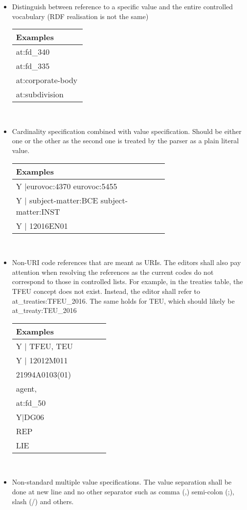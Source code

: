 \begin{itemize}
    \item
    Distinguish between reference to a specific value and the entire controlled vocabulary (RDF realisation is not the same)

    \begin{tabular}{|p{0.3\linewidth}|}
        \hline
        \textbf{Examples} \\ \hline
        at:fd\_340      \\ \hline
        at:fd\_335      \\ \hline
        at:corporate-body       \\ \hline
        at:subdivision      \\ \hline
    \end{tabular}
    \\
    \item
    Cardinality specification combined with value specification. Should be either one or the other as the second one is treated by the parser as a plain literal value.

    \begin{tabular}{|p{0.65\linewidth}|}
        \hline
        \textbf{Examples} \\ \hline
        Y |eurovoc:4370 eurovoc:5455      \\ \hline
        Y | subject-matter:BCE subject-matter:INST      \\ \hline
        Y | 12016EN01       \\ \hline
    \end{tabular}
    \\
    \item
    Non-URI code references that are meant as URIs. The editors shall also pay attention when resolving the references as the current codes do not correspond to those in controlled lists. For example, in the treaties table, the TFEU concept does not exist. Instead, the editor shall refer to at\_treaties:TFEU\_2016. The same holds for TEU, which should likely be at\_treaty:TEU\_2016

    \begin{tabular}{|p{0.4\linewidth}|}
        \hline
        \textbf{Examples} \\ \hline
        Y | TFEU, TEU      \\ \hline
        Y | 12012M011      \\ \hline
        21994A0103(01)       \\ \hline
        agent,\\
        at:fd\_50       \\ \hline
        Y|DG06      \\ \hline
        REP      \\ \hline
        LIE     \\ \hline
    \end{tabular}
    \\
    \item
    Non-standard multiple value specifications. The value separation shall be done at new line and no other separator such as comma (,) semi-colon (;), slash (/) and others.


\end{itemize}
